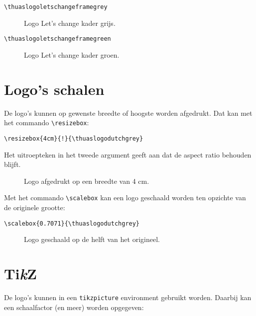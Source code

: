 \documentclass[a4paper,12pt]{article}
\begin{document}
\begin{verbatim}
\thuaslogoletschangeframegrey
\end{verbatim}

\begin{figure}[H]
\centering\fboxsep=0pt%
\fbox{%
\thuaslogoletschangeframegrey}
\caption{Logo Let's change kader grijs.}
\end{figure}

\begin{verbatim}
\thuaslogoletschangeframegreen
\end{verbatim}

\begin{figure}[H]
\centering\fboxsep=0pt%
\fbox{%
\thuaslogoletschangeframegreen}
\caption{Logo Let's change kader groen.}
\end{figure}


\section{Logo's schalen}
De logo's kunnen op gewenste breedte of hoogste worden afgedrukt. Dat kan met
het commando \verb|\resizebox|:

\begin{verbatim}
\resizebox{4cm}{!}{\thuaslogodutchgrey}
\end{verbatim}

Het uitroepteken in het tweede argument geeft aan dat de aspect ratio behouden
blijft.

\begin{figure}[H]
\centering
\resizebox{4cm}{!}{\thuaslogodutchgrey}
\caption{Logo afgedrukt op een breedte van 4 cm.}
\end{figure}

Met het commando \verb|\scalebox| kan een logo geschaald worden ten opzichte
van de originele grootte:

\begin{verbatim}
\scalebox{0.7071}{\thuaslogodutchgrey}
\end{verbatim}

\begin{figure}[H]
\centering
\scalebox{0.5}{\thuaslogodutchgrey}
\caption{Logo geschaald op de helft van het origineel.}
\end{figure}


\section{Ti\emph{k}Z}
De logo's kunnen in een \verb|tikzpicture| environment gebruikt worden. Daarbij
kan een schaalfactor (en meer) worden opgegeven:
\end{document}
